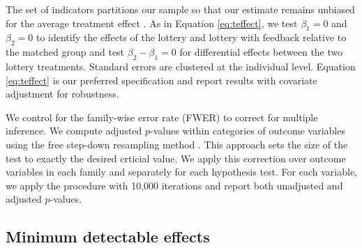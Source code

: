 \documentclass[11pt]{article}
\begin{document}
		The set of indicators partitions our sample so that our estimate remains unbiased for the average treatment effect . As in Equation \ref{eq:teffect}, we test $\beta_{1} = 0$ and $\beta_{2} = 0$ to identify the effects of the lottery and lottery with feedback relative to the matched group and test $\beta_{2} - \beta_{1} = 0$ for differential effects between the two lottery treatments. Standard errors are clustered at the individual level. Equation \ref{eq:teffect} is our preferred specification and report results with covariate adjustment for robustness.



		We control for the family-wise error rate (FWER) to correct for multiple inference. We compute adjusted $p$-values within categories of outcome variables using the free step-down resampling method . This approach sets the size of the test to exactly the desired crticial value. We apply this correction over outcome variables in each family and separately for each hypothesis test. For each variable, we apply the procedure with 10,000 iterations and report both unadjusted and adjusted $p$-values.

	\subsection{Minimum detectable effects}
\end{document}
